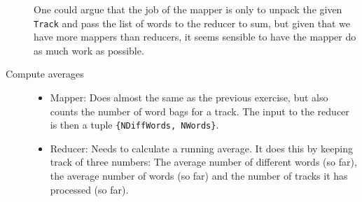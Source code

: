 \documentclass[a4paper]{article}
\begin{document}
\begin{description}
  One could argue that the job of the mapper is only to unpack the given \texttt{Track} and pass the list of words to the reducer to sum, but given that we have more mappers than reducers, it seems sensible to have the mapper do as much work as possible.
\item[Compute averages]\hfill
  \begin{itemize}
  \item Mapper: Does almost the same as the previous exercise, but also counts the number of word bags for a track. The input to the reducer is then a tuple \texttt{\{NDiffWords, NWords\}}.
  \item Reducer: Needs to calculate a running average. It does this by keeping track of three numbers: The average number of different words (so far), the average number of words (so far) and the number of tracks it has processed (so far).


\end{itemize}
\end{description}
\end{document}

